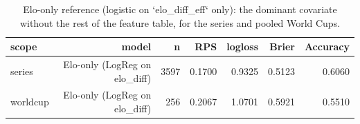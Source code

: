 \begin{table}[t]
  \centering
  \caption{Elo-only reference (logistic on `elo_diff_eff` only): the dominant covariate without the rest of the feature table, for the series and pooled World Cups.}
  \label{tab:rev_elo_only}
  \begin{tabular}{lrrrrrr}
  \toprule
  scope & model & n & RPS & logloss & Brier & Accuracy \\
  \midrule
  series & Elo-only (LogReg on elo\_diff) & 3597 & 0.1700 & 0.9325 & 0.5123 & 0.6060 \\
  worldcup & Elo-only (LogReg on elo\_diff) & 256 & 0.2067 & 1.0701 & 0.5921 & 0.5510 \\
  \bottomrule
  \end{tabular}
\end{table}
